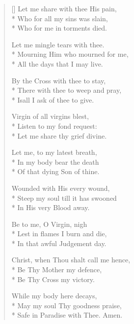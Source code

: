 \begin{verse}[\versewidth]
Let me share with thee His pain,\\*
Who for all my sins was slain,\\*
Who for me in torments died.

Let me mingle tears with thee.\\*
Mourning Him who mourned for me,\\*
All the days that I may live.

By the Cross with thee to stay,\\*
There with thee to weep and pray,\\*
Is\lyrlink all I ask of thee to give.

Virgin of all virgins blest,\\*
Listen to my fond request:\\*
Let me share thy grief divine.

Let me, to my latest breath,\\*
In my body bear the death\\*
Of that dying Son of thine.

Wounded with His every wound,\\*
Steep my soul till it has swooned\\*
In His very Blood away.

Be to me, O Virgin, nigh\\*
Lest in  flames I burn and die,\\*
In that awful Judgement day.

Christ, when Thou shalt call me hence,\\*
Be Thy Mother my defence,\\*
Be Thy Cross my victory.

While my body here decays,\\*
May my soul Thy goodness praise,\\*
Safe in Paradise with Thee. Amen.

\end{verse}

